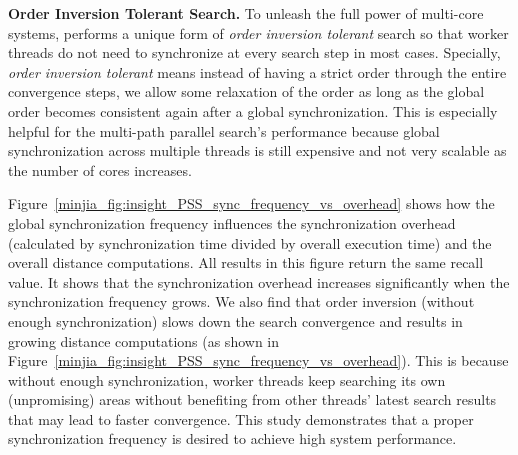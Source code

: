 \noindent\textbf{Order Inversion Tolerant Search.} 
To unleash the full power of multi-core systems, \Hammer performs a unique form of \emph{order inversion tolerant} search so that worker threads do not need to synchronize at every search step in most cases. 
Specially, \emph{order inversion tolerant} means instead of having a strict order through the entire convergence steps, we allow some relaxation of the order as long as the global order becomes consistent again after a global synchronization.
This is especially helpful for the multi-path parallel search's performance because global synchronization across multiple threads is still expensive and not very scalable as the number of cores increases. 

Figure~\ref{minjia_fig:insight_PSS_sync_frequency_vs_overhead} shows how the global synchronization frequency influences the synchronization overhead (calculated by synchronization time divided by  overall execution time) and the overall distance computations. All results in this figure return the same recall value. 
It shows that the synchronization overhead increases significantly when the synchronization frequency grows.
We also find that order inversion (without enough synchronization) slows down the search convergence and results in growing distance computations (as shown in Figure~\ref{minjia_fig:insight_PSS_sync_frequency_vs_overhead}). This is because without enough synchronization, worker threads keep searching its own (unpromising) areas without benefiting from other threads' latest search results that may lead to faster convergence. This study demonstrates that a proper synchronization frequency is desired to achieve high system performance.  


